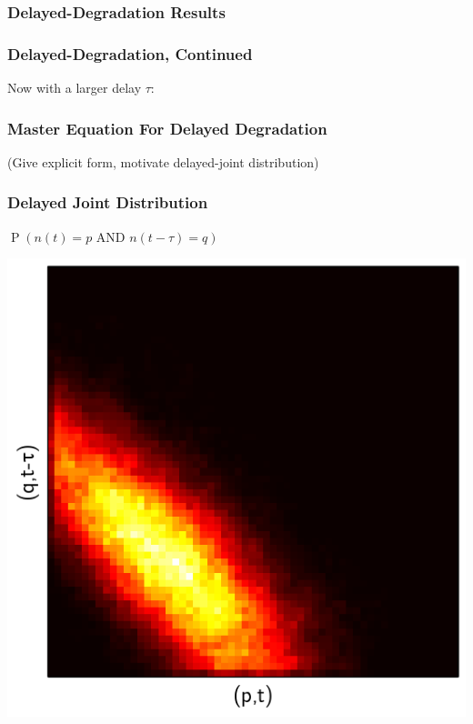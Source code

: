 \documentclass[xcolor={usenames,dvipsnames,svgnames}]{beamer}
\DeclareMathOperator{\Prob}{P}
\begin{document}
\begin{frame}
    \frametitle{Delayed-Degradation Results}
    \begin{center}
        \resizebox{0.48\textwidth}{!}{
            
        }
        \resizebox{0.48\textwidth}{!}{
            
        }
    \end{center}
\end{frame}

\begin{frame}
    \frametitle{Delayed-Degradation, Continued}
    Now with a larger delay $\tau$:

    \begin{center}
        \resizebox{0.48\textwidth}{!}{
            
        }
        \resizebox{0.48\textwidth}{!}{
            
        }
    \end{center}
\end{frame}

\begin{frame}
    \frametitle{Master Equation For Delayed Degradation}

    (Give explicit form, motivate delayed-joint distribution)
\end{frame}

\begin{frame}
    \frametitle{Delayed Joint Distribution}
    \begin{center}
        $\Prob \left(n(t) = p \text{ AND } n(t - \tau) = q \right)$

        \includegraphics[height=0.6\textheight]{../results/presentation/ddjd-a100-c3.png}
    \end{center}
\end{frame}
\end{document}
